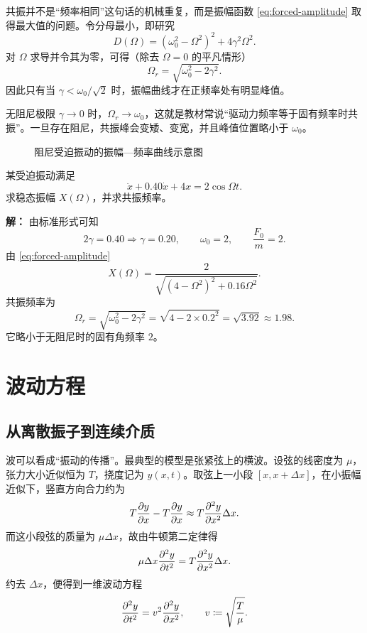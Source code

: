 共振并不是“频率相同”这句话的机械重复，而是振幅函数 \eqref{eq:forced-amplitude} 取得最大值的问题。令分母最小，即研究
\[
D(\Omega)=(\omega_0^2-\Omega^2)^2+4\gamma^2\Omega^2.
\]
对 $\Omega$ 求导并令其为零，可得（除去 $\Omega=0$ 的平凡情形）
\[
\Omega_r=\sqrt{\omega_0^2-2\gamma^2}.
\]
因此只有当 $\gamma<\omega_0/\sqrt2$ 时，振幅曲线才在正频率处有明显峰值。

\begin{remark}
无阻尼极限 $\gamma\to 0$ 时，$\Omega_r\to\omega_0$，这就是教材常说“驱动力频率等于固有频率时共振”。一旦存在阻尼，共振峰会变矮、变宽，并且峰值位置略小于 $\omega_0$。
\end{remark}

\begin{figure}[H]
\centering
{}
\caption{阻尼受迫振动的振幅—频率曲线示意图}
\end{figure}

\begin{example}
某受迫振动满足
\[
\ddot x+0.40\dot x+4x=2\cos\Omega t.
\]
求稳态振幅 $X(\Omega)$，并求共振频率。

\textbf{解：} 由标准形式可知
\[
2\gamma=0.40\Rightarrow \gamma=0.20,
\qquad
\omega_0=2,
\qquad
\frac{F_0}{m}=2.
\]
由 \eqref{eq:forced-amplitude}
\[
X(\Omega)=\frac{2}{\sqrt{(4-\Omega^2)^2+0.16\Omega^2}}.
\]
共振频率为
\[
\Omega_r=\sqrt{\omega_0^2-2\gamma^2}
=\sqrt{4-2\times 0.2^2}
=\sqrt{3.92}
\approx 1.98.
\]
它略小于无阻尼时的固有角频率 $2$。
\end{example}

\section{波动方程}

\subsection{从离散振子到连续介质}

波可以看成“振动的传播”。最典型的模型是张紧弦上的横波。设弦的线密度为 $\mu$，张力大小近似恒为 $T$，挠度记为 $y(x,t)$。取弦上一小段 $[x,x+\Delta x]$，在小振幅近似下，竖直方向合力约为
\[
T\pdv{y}{x}(x+\Delta x,t)-T\pdv{y}{x}(x,t)
\approx T\pdv[2]{y}{x}\Delta x.
\]
而这小段弦的质量为 $\mu\Delta x$，故由牛顿第二定律得
\[
\mu\Delta x\pdv[2]{y}{t}=T\pdv[2]{y}{x}\Delta x.
\]
约去 $\Delta x$，便得到一维波动方程
\begin{equation}
\pdv[2]{y}{t}=v^2\pdv[2]{y}{x},
\qquad
v\coloneqq \sqrt{\frac{T}{\mu}}.
\label{eq:wave}
\end{equation}

